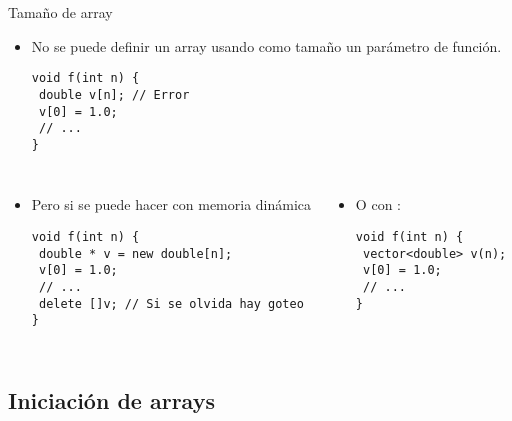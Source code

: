 \begin{frame}[t,fragile]{Tamaño de array}
\begin{itemize}
  \item No se puede definir un array usando como tamaño un parámetro de función.
\begin{lstlisting}
void f(int n) {
 double v[n]; // Error
 v[0] = 1.0;
 // ...
}
\end{lstlisting}
\end{itemize}

\begin{columns}[T]

\begin{itemize}
  \item Pero si se puede hacer con memoria dinámica
\begin{lstlisting}
void f(int n) {
 double * v = new double[n];
 v[0] = 1.0;
 // ...
 delete []v; // Si se olvida hay goteo
}
\end{lstlisting}
\end{itemize}

\begin{itemize}
  \item O con :
\begin{lstlisting}
void f(int n) {
 vector<double> v(n);
 v[0] = 1.0;
 // ...
}
\end{lstlisting}
\end{itemize}
\end{columns}

\end{frame}

\subsection{Iniciación de arrays}


